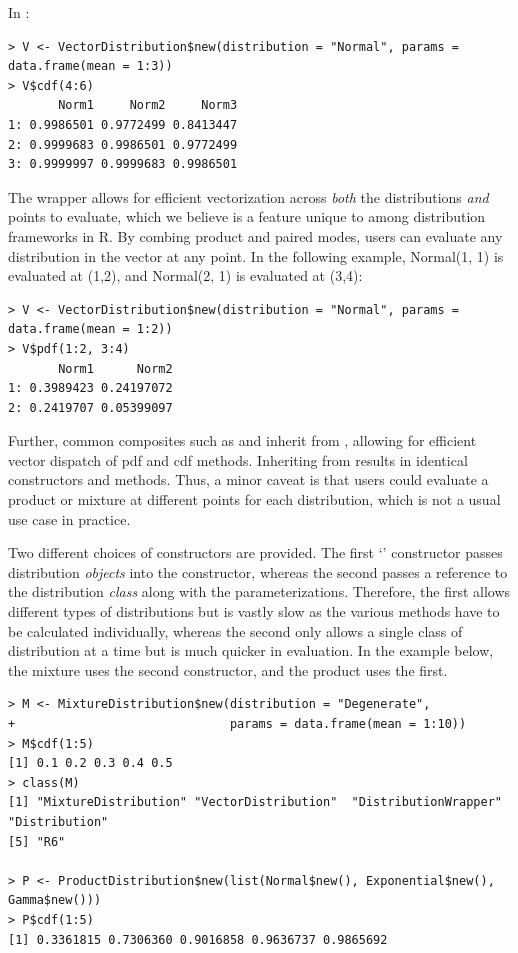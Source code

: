 In :

\begin{verbatim}
> V <- VectorDistribution$new(distribution = "Normal", params = data.frame(mean = 1:3))
> V$cdf(4:6)
       Norm1     Norm2     Norm3
1: 0.9986501 0.9772499 0.8413447
2: 0.9999683 0.9986501 0.9772499
3: 0.9999997 0.9999683 0.9986501
\end{verbatim}

The  wrapper allows for efficient vectorization across \textit{both} the distributions \textit{and} points to evaluate, which we believe is a feature unique to  among distribution frameworks in R. By combing product and paired modes, users can evaluate any distribution in the vector at any point. In the following example, Normal(1, 1) is evaluated at (1,2), and Normal(2, 1) is evaluated at (3,4):

\begin{verbatim}
> V <- VectorDistribution$new(distribution = "Normal", params = data.frame(mean = 1:2))
> V$pdf(1:2, 3:4)
       Norm1      Norm2
1: 0.3989423 0.24197072
2: 0.2419707 0.05399097
\end{verbatim}

Further, common composites such as  and  inherit from , allowing for efficient vector dispatch of pdf and cdf methods. Inheriting from  results in identical constructors and methods. Thus, a minor caveat is that users could evaluate a product or mixture at different points for each distribution, which is not a usual use case in practice.

Two different choices of constructors are provided. The first `' constructor passes distribution \textit{objects} into the constructor, whereas the second passes a reference to the distribution \textit{class} along with the parameterizations. Therefore, the first allows different types of distributions but is vastly slow as the various methods have to be calculated individually, whereas the second only allows a single class of distribution at a time but is much quicker in evaluation. In the example below, the mixture uses the second constructor, and the product uses the first.

\begin{verbatim}
> M <- MixtureDistribution$new(distribution = "Degenerate",
+                              params = data.frame(mean = 1:10))
> M$cdf(1:5)
[1] 0.1 0.2 0.3 0.4 0.5
> class(M)
[1] "MixtureDistribution" "VectorDistribution"  "DistributionWrapper" "Distribution"
[5] "R6"

> P <- ProductDistribution$new(list(Normal$new(), Exponential$new(), Gamma$new()))
> P$cdf(1:5)
[1] 0.3361815 0.7306360 0.9016858 0.9636737 0.9865692
\end{verbatim}

